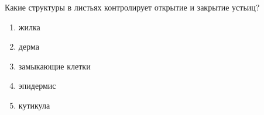 
Какие структуры в
листьях контролирует открытие и закрытие устьиц?

\begin{enumerate}
    \item жилка
    \item дерма 
    \item замыкающие клетки 
    \item эпидермис
    \item кутикула
\end{enumerate}

\explanationSection

